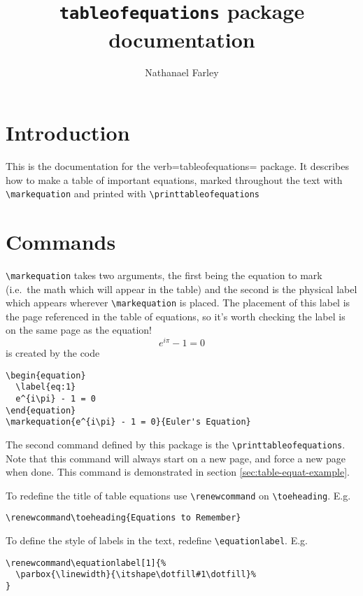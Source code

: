 \documentclass{article}
\begin{document}
\title{\texttt{tableofequations} package documentation}
\author{Nathanael Farley}
\maketitle

\section{Introduction}
\label{sec:introduction}

This is the documentation for the verb=tableofequations= package. It describes how to make a table of important equations, marked throughout the text with \verb=\markequation= and printed with \verb=\printtableofequations=

\section{Commands}
\label{sec:commands}

\verb=\markequation= takes two arguments, the first being the equation to mark (i.e.\ the math which will appear in the table) and the second is the physical label which appears wherever \verb=\markequation= is placed. The placement of this label is the page referenced in the table of equations, so it's worth checking the label is on the same page as the equation!
\begin{equation}
  \label{eq:1}
  e^{i\pi} - 1 = 0
\end{equation}
is created by the code
\begin{verbatim}
\begin{equation}
  \label{eq:1}
  e^{i\pi} - 1 = 0
\end{equation}
\markequation{e^{i\pi} - 1 = 0}{Euler's Equation}
\end{verbatim}

The second command defined by this package is the \verb=\printtableofequations=. Note that this command will always start on a new page, and force a new page when done. This command is demonstrated in section \ref{sec:table-equat-example}.

To redefine the title of table equations use \verb=\renewcommand= on \verb=\toeheading=. E.g.
\begin{verbatim}
\renewcommand\toeheading{Equations to Remember}
\end{verbatim}

To define the style of labels in the text, redefine \verb=\equationlabel=. E.g.
\begin{verbatim}
\renewcommand\equationlabel[1]{%
  \parbox{\linewidth}{\itshape\dotfill#1\dotfill}%
}
\end{verbatim}
\end{document}
